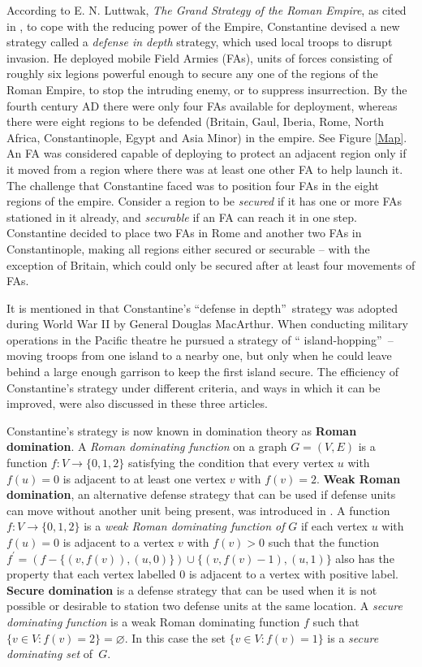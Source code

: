 \documentclass[12pt]{article}%
\begin{document}
According to E. N. Luttwak, \emph{The Grand Strategy of the Roman Empire}, as
cited in \cite{ReVelleRos}, to cope with the reducing power of the Empire,
Constantine devised a new strategy called a \emph{defense in depth} strategy,
which used local troops to disrupt invasion. He deployed mobile Field Armies
(FAs), units of forces consisting of roughly six legions powerful enough to
secure any one of the regions of the Roman Empire, to stop the intruding
enemy, or to suppress insurrection. By the fourth century AD there were only
four FAs available for deployment, whereas there were eight regions to be
defended (Britain, Gaul, Iberia, Rome, North Africa, Constantinople, Egypt and
Asia Minor) in the empire. See Figure \ref{Map}. An FA was considered capable
of deploying to protect an adjacent region only if it moved from a region
where there was at least one other FA to help launch it. The challenge that
Constantine faced was to position four FAs in the eight regions of the empire.
Consider a region to be \emph{secured} if it has one or more FAs stationed in
it already, and \emph{securable} if an FA can reach it in one step.
Constantine decided to place two FAs in Rome and another two FAs in
Constantinople, making all regions either secured or securable -- with the
exception of Britain, which could only be secured after at least four
movements of FAs.

It is mentioned in \cite{AF, ReVelleRos, Stewart} that Constantine's
\textquotedblleft defense in depth\textquotedblright\ strategy was adopted
during World War II by General Douglas MacArthur. When conducting military
operations in the Pacific theatre he pursued a strategy of \textquotedblleft
island-hopping\textquotedblright\ -- moving troops from one island to a nearby
one, but only when he could leave behind a large enough garrison to keep the
first island secure. The efficiency of Constantine's strategy under different
criteria, and ways in which it can be improved, were also discussed in these
three articles.

Constantine's strategy is now known in domination theory as \textbf{Roman
domination}. A \emph{Roman dominating function} on a graph $G=(V,E)$ is a
function $f:V\rightarrow\{0,1,2\}$ satisfying the condition that every vertex
$u$ with $f(u)=0$ is adjacent to at least one vertex $v$ with $f(v)=2$.
\textbf{Weak Roman domination}, an alternative defense strategy that can be
used if defense units can move without another unit being present, was
introduced in \cite{HH2003}. A function $f:V\rightarrow\{0,1,2\}$ is a
\emph{weak Roman dominating function of }$G$ if each vertex $u$ with $f(u)=0$
is adjacent to a vertex $v$ with $f(v)>0$ such that the function $f^{\prime
}=(f-\{(v,f(v)),(u,0)\})\cup\{(v,f(v)-1),(u,1)\}$ also has the property that
each vertex labelled 0 is adjacent to a vertex with positive label.
\textbf{Secure domination} is a defense strategy that can be used when it is
not possible or desirable to station two defense units at the same location. A
\emph{secure dominating function }is a weak Roman dominating function $f$ such
that $\{v\in V:f(v)=2\}=\varnothing$. In this case the set $\{v\in V:f(v)=1\}$
is a \emph{secure dominating set }of~$G$.
\end{document}
